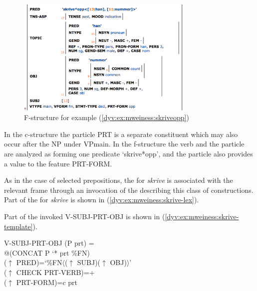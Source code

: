 \documentclass[output=paper]{langsci/langscibook}
\begin{document}
\begin{figure}
  \includegraphics[width=0.75\textwidth]{figures/particlecons-f.png}
  \caption{F-structure for example (\ref{dyv:ex:mweiness:skriveopp})}
  \label{dyv:fig:mweiness:particlecons-f}
\end{figure}


In the c-structure the particle PRT is a separate constituent which may also occur after the NP under VPmain.
In the f-structure the verb and the particle are analyzed as forming one predicate `skrive*opp', and the particle also provides a value to the feature PRT-FORM.

As in the case of selected prepositions, the  for \textit{skrive} is associated with the relevant frame through an invocation of the  describing this class of constructions.
Part of the  for \textit{skrive} is shown in  (\ref{dyv:ex:mweiness:skrive-lex}).


Part of the invoked  V-SUBJ-PRT-OBJ is shown in  (\ref{dyv:ex:mweiness:skrive-template}).

\ea\label{dyv:ex:mweiness:skrive-template}
{\small 
V-SUBJ-PRT-OBJ (P prt) =\\
\hspace{2em} @(CONCAT P `* prt \%FN)\\
\hspace{2em}  ($\uparrow$ PRED)=`\%FN$\langle$($\uparrow$ SUBJ)($\uparrow$ OBJ)$\rangle$'\\
\hspace{2em}  ($\uparrow$ CHECK PRT-VERB)=+\\
\hspace{2em}  ($\uparrow$ PRT-FORM)=c prt
}
\z
\end{document}
